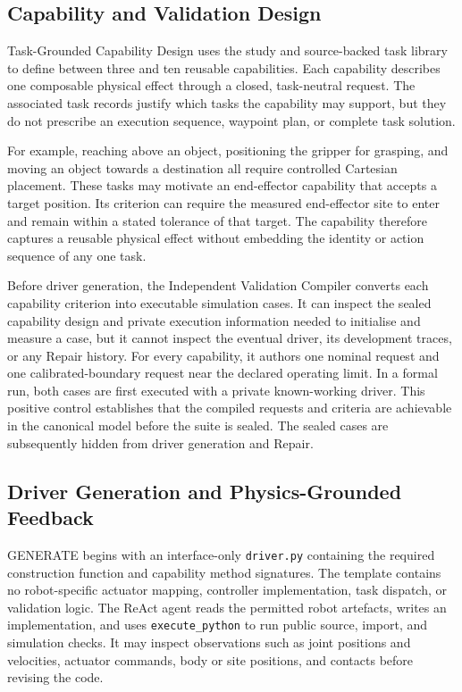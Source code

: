 \subsection{Capability and Validation Design}

Task-Grounded Capability Design uses the study and source-backed task library
to define between three and ten reusable capabilities. Each capability
describes one composable physical effect through a closed, task-neutral
request. The associated task records justify which tasks the capability may
support, but they do not prescribe an execution sequence, waypoint plan, or
complete task solution.

For example, reaching above an object, positioning the gripper for grasping,
and moving an object towards a destination all require controlled Cartesian
placement. These tasks may motivate an end-effector capability that accepts a
target position. Its criterion can require the measured end-effector site to
enter and remain within a stated tolerance of that target. The capability
therefore captures a reusable physical effect without embedding the identity
or action sequence of any one task.

Before driver generation, the Independent Validation Compiler converts each
capability criterion into executable simulation cases. It can inspect the
sealed capability design and private execution information needed to initialise
and measure a case, but it cannot inspect the eventual driver, its development
traces, or any Repair history. For every capability, it authors one nominal
request and one calibrated-boundary request near the declared operating limit.
In a formal run, both cases are first executed with a private known-working
driver. This positive control establishes that the compiled requests and
criteria are achievable in the canonical model before the suite is sealed.
The sealed cases are subsequently hidden from driver generation and Repair.

\subsection{Driver Generation and Physics-Grounded Feedback}

GENERATE begins with an interface-only \texttt{driver.py} containing the
required construction function and capability method signatures. The template
contains no robot-specific actuator mapping, controller implementation, task
dispatch, or validation logic. The ReAct agent reads the permitted robot
artefacts, writes an implementation, and uses \texttt{execute\_python} to run
public source, import, and simulation checks. It may inspect observations such
as joint positions and velocities, actuator commands, body or site positions,
and contacts before revising the code.

